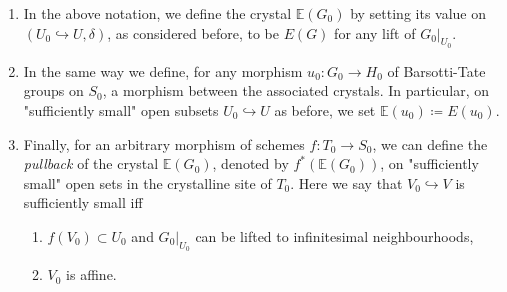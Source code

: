 \begin{defn}[]\label{MessingCrystalDefinition}\leavevmode\vspace{-\baselineskip}
\begin{enumerate}
\item In the above notation, we define the crystal $\mathbb{E}(G_0)$
	by setting its value on $\left(U_0 \hookrightarrow U, \delta\right)$, as considered
	before, to be $E(G)$ for any lift of $\left.G_0\right|_{U_0}$.

\item In the same way we define, for any morphism $u_0\colon G_0 \to H_0$ of 
	Barsotti-Tate groups on $S_0$, a morphism 
	between the associated crystals.
	In particular, on "sufficiently
	small" open subsets $U_0 \hookrightarrow U$ as before,
	we set $\mathbb{E}(u_0) \coloneqq E(u_0)$.

\item Finally, for an arbitrary morphism of schemes $f\colon T_0 \to S_0$,
	we can define the \emph{pullback} of the crystal $\mathbb{E}(G_0)$, denoted
	by $f^* \left( \mathbb{E}(G_0) \right)$, on "sufficiently small" open
	sets in the crystalline site of $T_0$.
	Here we say that $V_0 \hookrightarrow V$ is sufficiently small iff
\begin{enumerate}
	\item $f(V_0) \subset U_0$ and $\left.G_0\right|_{U_0}$ can be lifted to infinitesimal
		neighbourhoods,

	\item $V_0$ is affine.
\end{enumerate}
\end{enumerate}
\end{defn}



